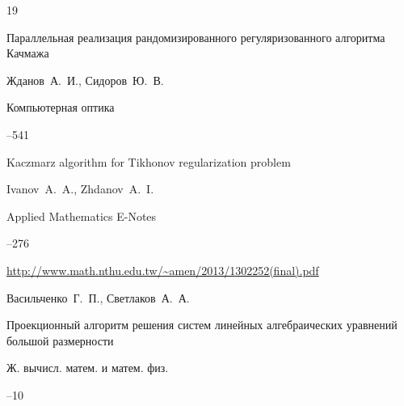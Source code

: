 \begin{thebibliography}{19}


\paper Параллельная реализация рандомизированного регуляризованного алгоритма Качмажа

\by Жданов~А.~И., Сидоров~Ю.~В.

\jour Компьютерная оптика




--541







\paper Kaczmarz algorithm for Tikhonov regularization problem

\by Ivanov~A.~A., Zhdanov~A.~I.

\jour Applied Mathematics E-Notes 



--276

\elink \url{http://www.math.nthu.edu.tw/~amen/2013/1302252(final).pdf}




\by Васильченко~Г.~П., Светлаков~А.~А. 

\paper Проекционный алгоритм решения систем линейных алгебраических уравнений большой размерности 

\jour Ж. вычисл. матем. и матем. физ.



--10









\end{thebibliography}
